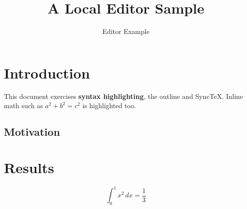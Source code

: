 \documentclass[11pt,a4paper]{article}
\title{A Local Editor Sample}
\author{Editor Example}
\begin{document}
\maketitle

\section{Introduction}
This document exercises \textbf{syntax highlighting}, the outline and SyncTeX.
Inline math such as $a^2 + b^2 = c^2$ is highlighted too.

\subsection{Motivation}


\section{Results}
\begin{equation}
  \int_0^1 x^2 \, dx = \frac{1}{3}
\end{equation}


\end{document}
